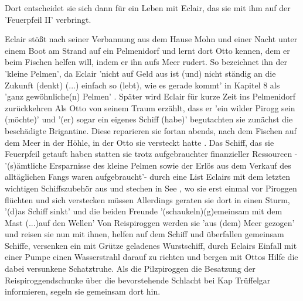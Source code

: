 Dort entscheidet sie sich dann für ein Leben mit Eclair\cite[S.635]{pir}, das sie mit ihm auf der 'Feuerpfeil II' verbringt.\cite[S.639ff]{pir}

Eclair stößt nach seiner Verbannung aus dem Hause Mohn \cite[S.41]{pir} und einer Nacht unter einem Boot am Strand \cite[S.43]{pir} auf ein Pelmenidorf \cite[S.43]{pir} und lernt dort Otto kennen, dem er beim Fischen helfen will, indem er ihn aufs Meer rudert.\cite[S.45]{pir} So bezeichnet ihn der 'kleine Pelmen'\cite[S.45]{pir}, da Eclair 'nicht auf Geld aus ist (und) nicht ständig an die Zukunft (denkt) (...) einfach so (lebt), wie es gerade kommt' in Kapitel 8 als 'ganz gewöhnliche(n) Pelmen' \cite[S.68]{pir}. Später wird Eclair für kurze Zeit ins Pelmenidorf zurückkehren \cite[S.515ff]{pir}Als Otto von seinem Traum erzählt, dass er 'ein wilder Pirogg sein (möchte)'\cite[S.69f]{pir} und '(er) sogar ein eigenes Schiff (habe)' \cite[S.70]{pir} begutachten sie zunächst die beschädigte Brigantine\cite[S.75f]{pir}. Diese reparieren sie fortan abends, nach dem Fischen auf dem Meer\cite[S.90]{pir} in der Höhle, in der Otto sie versteckt hatte \cite[S.74f]{pir}. Das Schiff, das sie Feuerpfeil getauft haben\cite[S.92f]{pir} statten sie trotz aufgebrauchter finanzieller Ressourcen - '(s)ämtliche Ersparnisse des kleine Pelmen sowie der Erlös aus dem Verkauf des alltäglichen Fangs waren aufgebraucht'\cite[S.105]{pir}- durch eine List Eclairs mit dem letzten wichtigen Schiffszubehör aus\cite[S.106ff]{pir} und stechen in See \cite[S.136]{pir}, wo sie erst einmal vor Piroggen flüchten und sich verstecken müssen \cite[S.153ff]{pir} Allerdings geraten sie dort in einen Sturm, '(d)as Schiff sinkt' \cite[S.204]{pir} und die beiden Freunde '(schaukeln)(g)emeinsam mit dem Mast (...)auf den Wellen'\cite[S.205]{pir} Von Reispiroggen werden sie 'aus (dem) Meer gezogen'\cite[S.213]{pir} und reisen sie nun mit ihnen, helfen auf dem Schiff\cite[S.217]{pir} und überfallen gemeinsam Schiffe\cite[S.279ff]{pir}, versenken ein mit Grütze geladenes Wurstschiff,\cite[S.315]{pir} durch Eclairs Einfall mit einer Pumpe einen Wasserstrahl darauf zu richten \cite[S.310ff]{pir} und bergen mit Ottos Hilfe die dabei versunkene Schatztruhe.\cite[S.315f]{pir} Als die Pilzpiroggen die Besatzung der Reispiroggendschunke über die bevorstehende Schlacht bei Kap Trüffelgar informieren, segeln sie gemeinsam dort hin.\cite[S.318ff]{pir}
